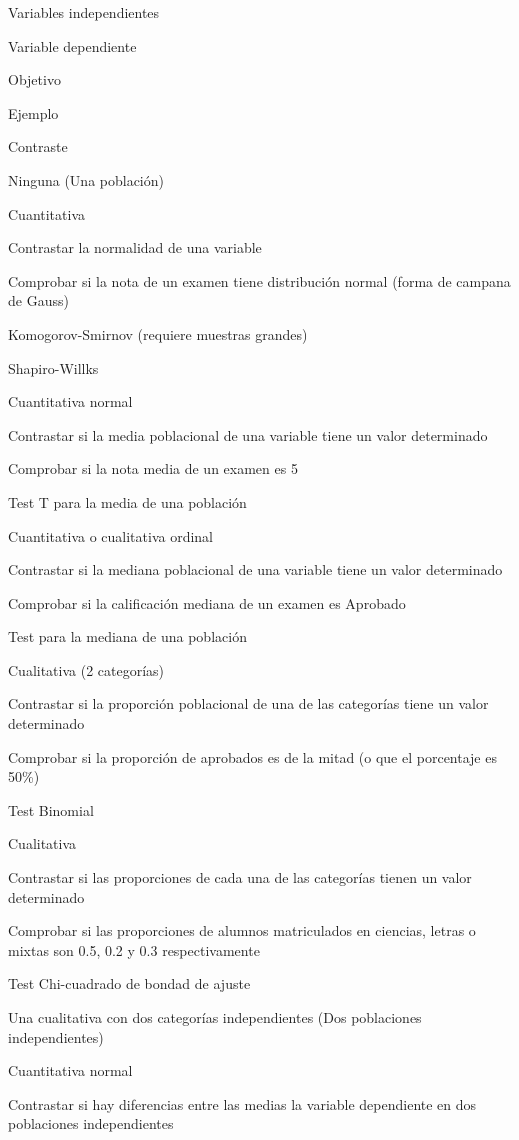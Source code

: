 \documentclass[
  spanish,
  a4paper,
]{scrreport}
\theoremstyle{definition}
\theoremstyle{definition}
\theoremstyle{remark}
\begin{document}
Variables independientes

Variable dependiente

Objetivo

Ejemplo

Contraste

Ninguna (Una población)

Cuantitativa

Contrastar la normalidad de una variable

Comprobar si la nota de un examen tiene distribución normal (forma de
campana de Gauss)

Komogorov-Smirnov (requiere muestras grandes)

Shapiro-Willks

Cuantitativa normal

Contrastar si la media poblacional de una variable tiene un valor
determinado

Comprobar si la nota media de un examen es 5

Test T para la media de una población

Cuantitativa o cualitativa ordinal

Contrastar si la mediana poblacional de una variable tiene un valor
determinado

Comprobar si la calificación mediana de un examen es Aprobado

Test para la mediana de una población

Cualitativa (2 categorías)

Contrastar si la proporción poblacional de una de las categorías tiene
un valor determinado

Comprobar si la proporción de aprobados es de la mitad (o que el
porcentaje es 50\%)

Test Binomial

Cualitativa

Contrastar si las proporciones de cada una de las categorías tienen un
valor determinado

Comprobar si las proporciones de alumnos matriculados en ciencias,
letras o mixtas son 0.5, 0.2 y 0.3 respectivamente

Test Chi-cuadrado de bondad de ajuste

Una cualitativa con dos categorías independientes (Dos poblaciones
independientes)

Cuantitativa normal

Contrastar si hay diferencias entre las medias la variable dependiente
en dos poblaciones independientes
\end{document}
